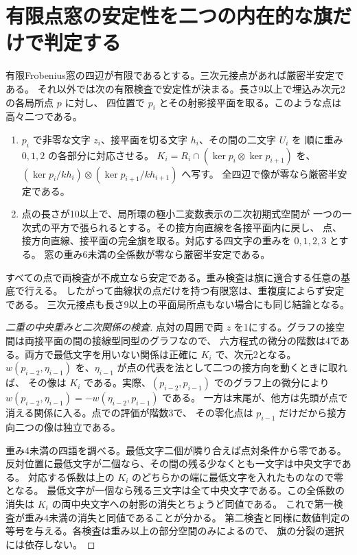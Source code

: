 \section{有限点窓の安定性を二つの内在的な旗だけで判定する}
\label{sec:finite-intrinsic-stability-test}
\begin{theorem}\label{thm:finite-intrinsic-stability-test}
有限Frobenius窓の四辺が有限であるとする。三次元接点があれば厳密半安定である。
それ以外では次の有限検査で安定性が決まる。長さ9以上で埋込み次元2の各局所点 $p$ に対し、
四位置で $p_i$ とその射影接平面を取る。このような点は高々二つである。
\begin{enumerate}
\item $p_i$ で非零な文字 $z_i$、接平面を切る文字 $h_i$、その間の二文字 $U_i$ を
順に重み $0,1,2$ の各部分に対応させる。
$K_i=R_i\cap(\ker p_i\otimes\ker p_{i+1})$ を、
$(\ker p_i/kh_i)\otimes(\ker p_{i+1}/kh_{i+1})$ へ写す。
全四辺で像が零なら厳密半安定である。
\item 点の長さが10以上で、局所環の極小二変数表示の二次初期式空間が
一つの一次式の平方で張られるとする。その接方向直線を各接平面内に戻し、
点、接方向直線、接平面の完全旗を取る。対応する四文字の重みを $0,1,2,3$ とする。
窓の重み6未満の全係数が零なら厳密半安定である。
\end{enumerate}
すべての点で両検査が不成立なら安定である。重み検査は旗に適合する任意の基底で行える。
したがって曲線状の点だけを持つ有限窓は、重複度によらず安定である。
三次元接点も長さ9以上の平面局所点もない場合にも同じ結論となる。
\end{theorem}
\begin{proof}[二重の中央重みと二次関係の検査]
点対の周囲で両 $z$ を1にする。グラフの接空間は両接平面の間の接線型同型のグラフなので、
六方程式の微分の階数は4である。両方で最低文字を用いない関係は正確に $K_i$ で、次元2となる。
$w(p_{i-2},\eta_{i-1})$ を、$\eta_{i-1}$ が点の代表を法として二つの接方向を動くときに取れば、
その像は $K_i$ である。実際、$(p_{i-2},p_{i-1})$ でのグラフ上の微分により
$w(p_{i-2},\eta_{i-1})=-w(\eta_{i-2},p_{i-1})$ である。
一方は末尾が、他方は先頭が点で消える関係に入る。点での評価が階数3で、
その零化点は $p_{i-1}$ だけだから接方向二つの像は独立である。

重み4未満の四語を調べる。最低文字二個が隣り合えば点対条件から零である。
反対位置に最低文字が二個なら、その間の残る少なくとも一文字は中央文字である。
対応する係数は上の $K_i$ のどちらかの端に最低文字を入れたものなので零となる。
最低文字が一個なら残る三文字は全て中央文字である。この全係数の消失は
$K_i$ の両中央文字への射影の消失とちょうど同値である。
これで第一検査が重み4未満の消失と同値であることが分かる。
第二検査と同様に数値判定の等号を与える。各検査は重み以上の部分空間のみによるので、
旗の分裂の選択には依存しない。
\end{proof}

